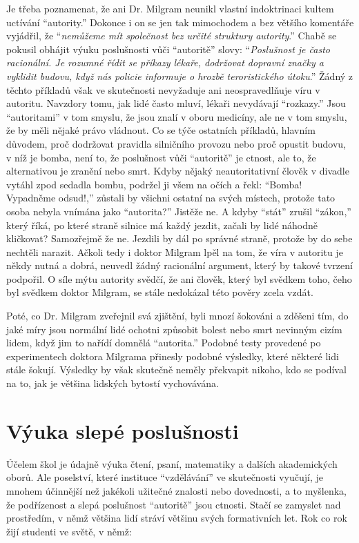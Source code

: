 \documentclass{book}
\begin{document}
Je třeba poznamenat, že ani Dr. Milgram neunikl vlastní indoktrinaci kultem uctívání \enquote{autority.} Dokonce i on se jen tak mimochodem a bez většího komentáře vyjádřil, že \enquote{\emph{nemůžeme mít společnost bez určité struktury autority}.} Chabě se pokusil obhájit výuku poslušnosti vůči \enquote{autoritě} slovy: \enquote{\emph{Poslušnost je často racionální. Je rozumné řídit se příkazy lékaře, dodržovat dopravní značky a vyklidit budovu, když nás policie informuje o hrozbě teroristického útoku}.} Žádný z těchto příkladů však ve skutečnosti nevyžaduje ani neospravedlňuje víru v autoritu. Navzdory tomu, jak lidé často mluví, lékaři nevydávají \enquote{rozkazy.} Jsou \enquote{autoritami} v tom smyslu, že jsou znalí v oboru medicíny, ale ne v tom smyslu, že by měli nějaké právo vládnout. Co se týče ostatních příkladů, hlavním důvodem, proč dodržovat pravidla silničního provozu nebo proč opustit budovu, v níž je bomba, není to, že poslušnost vůči \enquote{autoritě} je ctnost, ale to, že alternativou je zranění nebo smrt. Kdyby nějaký neautoritativní člověk v divadle vytáhl zpod sedadla bombu, podržel ji všem na očích a řekl: \enquote{Bomba! Vypadněme odsud!,} zůstali by všichni ostatní na svých místech, protože tato osoba nebyla vnímána jako \enquote{autorita?} Jistěže ne. A kdyby \enquote{stát} zrušil \enquote{zákon,} který říká, po které straně silnice má každý jezdit, začali by lidé náhodně kličkovat? Samozřejmě že ne. Jezdili by dál po správné straně, protože by do sebe nechtěli narazit. Ačkoli tedy i doktor Milgram lpěl na tom, že víra v autoritu je někdy nutná a dobrá, neuvedl žádný racionální argument, který by takové tvrzení podpořil. O síle mýtu autority svědčí, že ani člověk, který byl svědkem toho, čeho byl svědkem doktor Milgram, se stále nedokázal této pověry zcela vzdát.

Poté, co Dr. Milgram zveřejnil svá zjištění, byli mnozí šokováni a zděšeni tím, do jaké míry jsou normální lidé ochotni způsobit bolest nebo smrt nevinným cizím lidem, když jim to nařídí domnělá \enquote{autorita.} Podobné testy provedené po experimentech doktora Milgrama přinesly podobné výsledky, které některé lidi stále šokují. Výsledky by však skutečně neměly překvapit nikoho, kdo se podíval na to, jak je většina lidských bytostí vychovávána.

\section{Výuka slepé poslušnosti}

Účelem škol je údajně výuka čtení, psaní, matematiky a dalších akademických oborů. Ale poselství, které instituce \enquote{vzdělávání} ve skutečnosti vyučují, je mnohem účinnější než jakékoli užitečné znalosti nebo dovednosti, a to myšlenka, že podřízenost a slepá poslušnost \enquote{autoritě} jsou ctnosti. Stačí se zamyslet nad prostředím, v němž většina lidí stráví většinu svých formativních let. Rok co rok žijí studenti ve světě, v němž:
\end{document}
